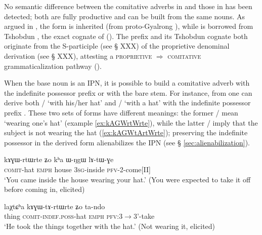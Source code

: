 No semantic difference between the comitative adverbs in  and those in  has been detected; both are fully productive and can be built from the same nouns. As argued in \citet{jacques17comitative}, the  form is inherited (from proto-Gyalrong ), while  is borrowed from Tshobdun , the exact cognate of   (\citealt[107]{jackson98morphology}). The prefix  and its Tshobdun cognate  both originate from the S-participle  (see § XXX) of the proprietive  denominal derivation (see § XXX), attesting a \textsc{proprietive} $\Rightarrow$ \textsc{comitative} grammaticalization pathway  (\citealt{jacques17comitative}). 

When the base noun is an IPN, it is possible to build a comitative adverb with the indefinite possessor prefix or with the bare stem. For instance, from  one can derive both  /  `with his/her hat' and  /   `with a hat' with the indefinite possessor prefix . These two sets of forms have different meanings: the former  /  mean `wearing one's hat' (example \ref{ex:kAGWrtWrte}), while the latter  /   imply that the subject is not wearing the hat (\ref{ex:kAGWtArtWrte}); preserving the indefinite possessor in the derived form alienabilizes the IPN (see § \ref{sec:alienabilization}).

\begin{exe}
\ex \label{ex:kAGWrtWrte}
\gll kɤɣɯ-rtɯ\tld{}rte 	ʑo 	kʰa	ɯ-ŋgɯ	lɤ-tɯ-ɣe	\\
\textsc{comit}-hat \textsc{emph} house \textsc{3sg}-inside \textsc{pfv}-2-come[II] \\
\glt `You came inside the house wearing your hat.' (You were expected to take it off before coming in, elicited)
\end{exe}

\begin{exe}
\ex \label{ex:kAGWtArtWrte}
\gll  laχtɕʰa	kɤɣɯ-tɤ-rtɯ\redp{}rte	ʑo	ta-ndo \\
thing \textsc{comit-indef.poss}-hat \textsc{emph} \textsc{pfv}:3$\rightarrow$3'-take \\
\glt `He took the things together with the hat.' (Not wearing it, elicited)
\end{exe}

